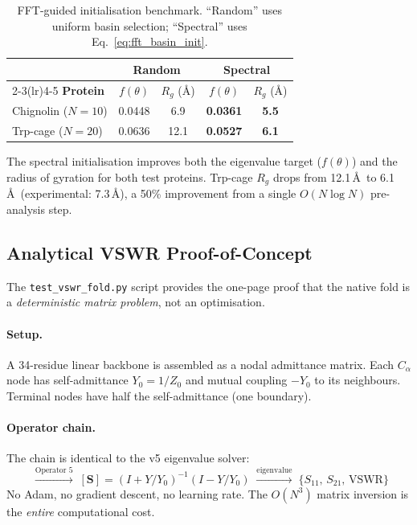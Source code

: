 \begin{table}[H]
\centering
\caption{FFT-guided initialisation benchmark.
``Random'' uses uniform basin selection;
``Spectral'' uses Eq.~\ref{eq:fft_basin_init}.}
\label{tab:fft_init_benchmark}
\begin{tabular}{@{}l cc cc@{}}
\toprule
 & \multicolumn{2}{c}{\textbf{Random}} & \multicolumn{2}{c}{\textbf{Spectral}} \\
\cmidrule(lr){2-3}\cmidrule(lr){4-5}
\textbf{Protein} & $f(\theta)$ & $R_g$ (\AA) & $f(\theta)$ & $R_g$ (\AA) \\
\midrule
Chignolin ($N\!=\!10$) & 0.0448 & 6.9 & \textbf{0.0361} & \textbf{5.5} \\
Trp-cage ($N\!=\!20$)  & 0.0636 & 12.1 & \textbf{0.0527} & \textbf{6.1} \\
\bottomrule
\end{tabular}
\end{table}

\noindent The spectral initialisation improves both the eigenvalue
target ($f(\theta)$) and the radius of gyration for both test proteins.
Trp-cage $R_g$ drops from 12.1\,\AA\ to 6.1\,\AA\ (experimental:
7.3\,\AA), a 50\% improvement from a single $O(N \log N)$ pre-analysis
step.

\subsection{Analytical VSWR Proof-of-Concept}
\label{sec:vswr_proof}

The \texttt{test\_vswr\_fold.py} script provides the one-page proof
that the native fold is a \emph{deterministic matrix problem}, not
an optimisation.

\paragraph{Setup.}
A 34-residue linear backbone is assembled as a nodal admittance
matrix.  Each $C_\alpha$ node has self-admittance $Y_0 = 1/Z_0$
and mutual coupling $-Y_0$ to its neighbours.  Terminal nodes
have half the self-admittance (one boundary).

\paragraph{Operator chain.}
The chain is identical to the v5 eigenvalue solver:
\begin{equation}
    [\mathbf{Y}] \;\xrightarrow{\text{Operator 5}}\;
    [\mathbf{S}] = (I + Y/Y_0)^{-1}(I - Y/Y_0)
    \;\xrightarrow{\text{eigenvalue}}\;
    \{S_{11},\, S_{21},\, \text{VSWR}\}
    \label{eq:vswr_chain}
\end{equation}
No Adam, no gradient descent, no learning rate.  The $O(N^3)$
matrix inversion is the \emph{entire} computational cost.

